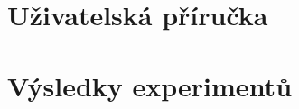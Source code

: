 
\chapter{Uživatelská příručka}
\label{apxManual}

\chapter{Výsledky experimentů}
\label{apxResults}
